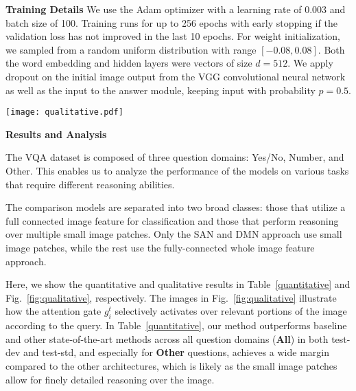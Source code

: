 \documentclass{article}
\begin{document}
\textbf{Training Details}
We use the Adam optimizer \cite{kingma2014adam} with a learning rate of 0.003 and batch size of 100.
Training runs for up to 256 epochs with early stopping if the validation loss has not improved in the last 10 epochs.
For weight initialization, we sampled from a random uniform distribution with range $[-0.08, 0.08]$.
Both the word embedding and hidden layers were vectors of size $d=512$.
We apply dropout on the initial image output from the VGG convolutional neural network \cite{simonyan2014very} as well as the input to the answer module, keeping input with probability $p=0.5$.

\begin{figure*}[t!]
   \centering
   	 	\texttt{[image: qualitative.pdf]}
   	 	\vspace{-0.6cm}
   \caption{
   Examples of qualitative results of attention for VQA.
   The original images are shown on the left.
   On the right we show how the attention gate $g^t_i$ activates given one pass over the image and query.
   White regions are the most active.
   Answers are given by the DMN+. }
   	 	\vspace{-0.2cm}
   \label{fig:qualitative}
\end{figure*}

\textbf{Results and Analysis}

The VQA dataset is composed of three question domains: Yes/No, Number, and Other.
This enables us to analyze the performance of the models on various tasks that require different reasoning abilities.

The comparison models are separated into two broad classes: those that utilize a full connected image feature for classification and those that perform reasoning over multiple small image patches.
Only the SAN and DMN approach use small image patches, while the rest use the fully-connected whole image feature approach.

Here, we show the quantitative and qualitative results in Table~\ref{quantitative} and Fig.~\ref{fig:qualitative}, respectively.
The images in Fig.~\ref{fig:qualitative} illustrate how the attention gate $g^t_i$ selectively activates over relevant portions of the image according to the query.
In Table~\ref{quantitative}, our method outperforms baseline and other state-of-the-art methods across all question domains (\textbf{All}) in both test-dev and test-std, and especially for \textbf{Other} questions,  achieves a wide margin compared to the other architectures, which is likely as the small image patches allow for finely detailed reasoning over the image.
\end{document}
